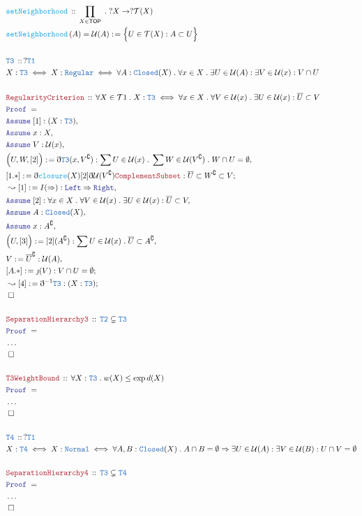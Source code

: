 \documentclass[12pt]{scrartcl}
\newcommand{\TYPE}[1]{\textcolor{NavyBlue}{\mathtt{#1}}}
\newcommand{\FUNC}[1]{\textcolor{Cerulean}{\mathtt{#1}}}
\newcommand{\LOGIC}[1]{\textcolor{Blue}{\mathtt{#1}}}
\newcommand{\THM}[1]{\textcolor{Maroon}{\mathtt{#1}}}
\renewcommand{\.}{\; . \;}
\newcommand{\de}{: \kern 0.1pc =}
\newcommand{\Act}[1]{\left( #1 \right)}
\newcommand{\Theorem}[2]{& \THM{#1} \, :: \, #2 \\ & \Proof = \\ }
\newcommand{\DeclareType}[2]{& \TYPE{#1} \, :: \, #2 \\}
\newcommand{\DefineNamedType}[4]{& #1 : \TYPE{#2} \iff #3 \iff #4 \\}
\newcommand{\DeclareFunc}[2]{& \FUNC{#1} \, :: \, #2 \\}
\newcommand{\DefineNamedFunc}[4]{&  \FUNC{#1}\Act{#2} = #3 \de #4 \\}
\newcommand{\Page}[1]{ \begin{align*} #1 \end{align*}   }
\newcommand{ \bd }{ \ByDef }
\newcommand{\NoProof}{ & \ldots \\ \EndProof}
\newcommand{\Imply}{\Rightarrow}
\renewcommand{\c}{\complement}
\newcommand{\Say}[3]{& #1 \de #2 : #3, \\}
\newcommand{\Conclude}[3]{& #1 \de #2 : #3; \\}
\newcommand{\Derive}[3]{& \leadsto #1 \de #2 : #3, \\}
\newcommand{\DeriveConclude}[3]{& \leadsto #1 \de #2 : #3 ; \\}
\newcommand{\Assume}[2]{& \LOGIC{Assume} \; #1 : #2, \\}
\newcommand{\QED}{\; \square}
\newcommand{\EndProof}{& \QED \\}
\newcommand{\ByDef}{\eth}
\newcommand{\ByConstr}{\jmath}
\newcommand{\Proof}{\LOGIC{Proof} \; }
\newcommand{\TOP}{\mathsf{TOP}}
\newcommand{\T}{\mathcal{T}}
\newcommand{\U}{\mathcal{U}}
\begin{document}
\Page{
	\DeclareFunc{setNeighborhood}{\prod_{X \in \TOP} \. ?X \to ?\T(X)}
	\DefineNamedFunc{setNeighborhood}{A}{\U(A)}{\Big\{ U \in \T(X) : A \subset U  \Big\}}
	\\
	\DeclareType{T3}{?\TYPE{T1}}
	\DefineNamedType{X}{T3}{X : \TYPE{Regular}}
	{
		\forall A : \TYPE{Closed}(X) \.
		\forall x \in X \.
		\exists U \in \U(A) :
		\exists V \in \U(x) :
		V \cap U
	}
	\\
	\Theorem{RegularityCriterion}{   
		\forall X \in \T1 \.
		X : \TYPE{T3} \iff 
		\forall x \in X \. \forall V \in \U(x) \. 
		\exists U \in \U(x) : \overline{U} \subset V
	}
	\Assume{[1]}{(X : \TYPE{T3})}
	\Assume{x}{X}
	\Assume{V}{\U(x)}
	\Say{\Big( U,W,[2] \Big)}{\bd \TYPE{T3}(x,V^\c)}
	{
		\sum U \in \U(x) \. \sum W \in \U(V^\c) \. W \cap U = \emptyset
	}
	\Conclude{ [1.*] }
	{
		\bd \FUNC{closure}(X)[2]\bd \U(V^\c) \THM{ComplementSubset}
	}
	{
		\overline{U} \subset W^\c \subset V
	}
	\Derive{ [1] }
	{ I(\Imply)  }{\LOGIC{Left} \Imply \LOGIC{Right}}
	\Assume{[2]}{   
		\forall x \in X \. \forall V \in \U(x) \. 
		\exists U \in \U(x) : \overline{U} \subset V	
	}
	\Assume{A}{\TYPE{Closed}(X)}
	\Assume{x}{A^\c}
	\Say{\Big( U, [3]\Big)}{[2](A^\c)}
	{
		\sum U \in \U(x) \. \overline{U} \subset A^\c
	}
	\Say{V}{\overline{U}^\c}{\U(A)}
	\Conclude{[A.*]}{\ByConstr(V)}{V \cap U = \emptyset} 
	\DeriveConclude{[4]}{\bd^{-1} \TYPE{T3}}{(X : \TYPE{T3})}
	\EndProof
	\\
	\Theorem{SeparationHierarchy3}
	{
		\TYPE{T2} \subsetneq \TYPE{T3}
	}
	\NoProof
	\\
	\Theorem{T3WeightBound}
	{
		\forall X : \TYPE{T3} \.
		w(X) \le \exp d(X)
	}
	\NoProof
	\\
	\DeclareType{T4}{?\TYPE{T1}}
	\DefineNamedType{X}{T4}{X : \TYPE{Normal}}
	{
		\forall A,B : \TYPE{Closed}(X) \.
		A \cap B = \emptyset 
		\Imply
		\exists U \in \U(A) :
		\exists V \in \U(B) :
		U \cap V = \emptyset
	}
	\\
	\Theorem{SeparationHierarchy4}
	{
		\TYPE{T3} \subsetneq \TYPE{T4}
	}
	\NoProof
}
\end{document}

